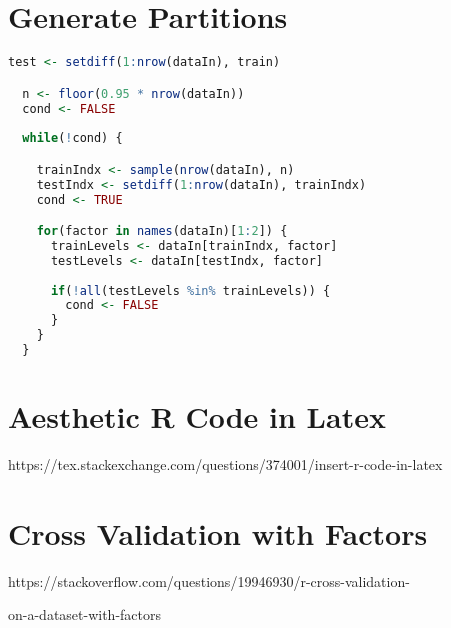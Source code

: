 \documentclass{article}
\begin{document}
\section{Generate Partitions}
\begin{lstlisting}[language=R]
  test <- setdiff(1:nrow(dataIn), train)

  n <- floor(0.95 * nrow(dataIn))
  cond <- FALSE
  
  while(!cond) {

    trainIndx <- sample(nrow(dataIn), n)
    testIndx <- setdiff(1:nrow(dataIn), trainIndx)
    cond <- TRUE

    for(factor in names(dataIn)[1:2]) {
      trainLevels <- dataIn[trainIndx, factor]
      testLevels <- dataIn[testIndx, factor]
      
      if(!all(testLevels %in% trainLevels)) {
        cond <- FALSE
      }
    }
  }
\end{lstlisting}

\section{Aesthetic R Code in Latex}
https://tex.stackexchange.com/questions/374001/insert-r-code-in-latex

\section{Cross Validation with Factors}
https://stackoverflow.com/questions/19946930/r-cross-validation-

on-a-dataset-with-factors
\end{document}

